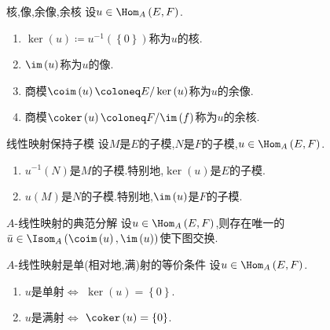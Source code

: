 \begin{definition}{核,像,余像,余核}{}
	设$u\in\Hom_{A}\left(E,F\right)$.
	\begin{enumerate}
		\item $\ker\left(u\right)\coloneq u^{-1}\left(\left\{0\right\}\right)$称为$u$的核.
		\item $\im\left(u\right)$称为$u$的像.
		\item 商模$\coim\left(u\right)\coloneq E/\ker\left(u\right)$称为$u$的余像.
		\item 商模$\coker\left(u\right)\coloneq F/\im\left(f\right)$称为$u$的余核.
	\end{enumerate}
\end{definition}

\begin{proposition}{线性映射保持子模}{}
	设$M$是$E$的子模,$N$是$F$的子模,$u\in\Hom_{A}\left(E,F\right)$.
	\begin{enumerate}
		\item $u^{-1}\left(N\right)$是$M$的子模.特别地,$\ker\left(u\right)$是$E$的子模.
		\item $u\left(M\right)$是$N$的子模.特别地,$\im\left(u\right)$是$F$的子模.
	\end{enumerate}
\end{proposition}

\begin{proposition}{$A$-线性映射的典范分解}{}
	设$u\in\Hom_{A}\left(E,F\right)$,则存在唯一的$\bar{u}\in\Isom_{A}\left(\coim\left(u\right),\im\left(u\right)\right)$使下图交换.
	\begin{center}
	\end{center}
\end{proposition}

\begin{proposition}{$A$-线性映射是单(相对地,满)射的等价条件}{}
	设$u\in\Hom_{A}\left(E,F\right)$.
	\begin{enumerate}
		\item $u$是单射$\iff$ $\ker\left(u\right)=\left\{0\right\}$.
		\item $u$是满射$\iff$ $\coker\left(u\right)=\left\{0\right\}$.
	\end{enumerate}
\end{proposition}

